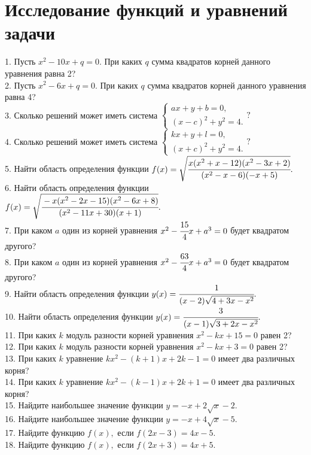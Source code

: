 \section{Исследование функций и уравнений задачи}
1. Пусть $x^2-10x+q=0.$ При каких $q$ сумма квадратов корней данного уравнения равна 2?\\
2. Пусть $x^2-6x+q=0.$ При каких $q$ сумма квадратов корней данного уравнения равна 4?\\
3. Сколько решений может иметь система $\begin{cases} ax+y+b=0,\\ (x-c)^2+y^2=4.\end{cases}?$\\
4. Сколько решений может иметь система $\begin{cases} kx+y+l=0,\\ (x+c)^2+y^2=4.\end{cases}?$\\
5. Найти область определения функции $f(x)=\sqrt{\cfrac{x(x^2+x-12)(x^2-3x+2)}{(x^2-x-6)(-x+5)}}.$\\
6. Найти область определения функции $f(x)=\sqrt{\cfrac{-x(x^2-2x-15)(x^2-6x+8)}{(x^2-11x+30)(x+1)}}.$\\
7. При каком $a$ один из корней уравнения $x^2-\cfrac{15}{4}x+a^3=0$ будет квадратом другого?\\
8. При каком $a$ один из корней уравнения $x^2-\cfrac{63}{4}x+a^3=0$ будет квадратом другого?\\
9. Найти область определения функции $y(x)=\cfrac{1}{(x-2)\sqrt{4+3x-x^2}}.$\\
10. Найти область определения функции $y(x)=\cfrac{3}{(x-1)\sqrt{3+2x-x^2}}.$\\
11. При каких $k$ модуль разности корней уравнения $x^2-kx+15=0$ равен 2?\\
12. При каких $k$ модуль разности корней уравнения $x^2-kx+3=0$ равен 2?\\
13. При каких $k$ уравнение $kx^2-(k+1)x+2k-1=0$ имеет два различных корня?\\
14. При каких $k$ уравнение $kx^2-(k-1)x+2k+1=0$ имеет два различных корня?\\
15. Найдите наибольшее значение функции $y=-x+2\sqrt{x}-2.$\\
16. Найдите наибольшее значение функции $y=-x+4\sqrt{x}-5.$\\
17. Найдите функцию $f(x),$ если $f(2x-3)=4x-5.$\\
18. Найдите функцию $f(x),$ если $f(2x+3)=4x+5.$\\
